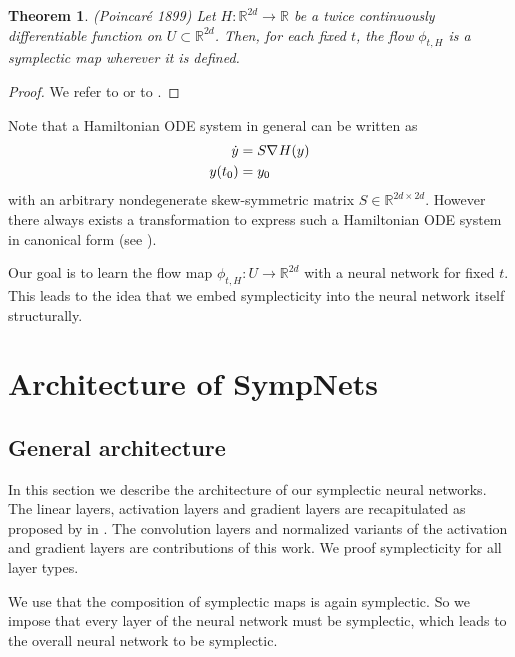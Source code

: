 \documentclass[twoside,a4paper]{article}
\newtheorem{theorem}{Theorem}
\begin{document}
\begin{theorem}(Poincaré 1899)
	Let $H: \mathbb{R}^{2d} \to \mathbb{R}$ be a twice continuously differentiable
	function on $U \subset \mathbb{R}^{2d}$. Then, for each fixed $t$, the flow
	$\phi_{t,H}$ is a symplectic map wherever it is defined.
\end{theorem}
\begin{proof}
	We refer to \citet[Theorem 2.4, p.~184]{hairer2006} 
	or to \citet[Theorem 1, p.~54]{leimkuhler_reich_2005}.
\end{proof}

Note that a Hamiltonian ODE system in general can be written as
\begin{align*}
	\dot{y} &= S \nabla_{}{H}(y) \\
	y(t_0) &= y_0
\end{align*}
with an arbitrary nondegenerate skew-symmetric matrix $S \in \mathbb{R}^{2d \times 2d}$.
However there always exists a transformation to express such a Hamiltonian ODE system in
canonical form (see \citet[Remark 3.8]{peng2016}). 

Our goal is to learn the flow map $\phi_{t,H} : U \to \mathbb{R}^{2d}$ with a neural network
for fixed $t$.
This leads to the idea that we embed symplecticity into the neural network itself structurally.

\section{Architecture of SympNets}

\subsection{General architecture}

In this section we describe the architecture of our symplectic neural networks.
The linear layers, activation layers and gradient layers are recapitulated as 
proposed by \citeauthor{Jin2020} in \cite{Jin2020}.
The convolution layers and normalized variants of the activation and gradient layers
are contributions of this work. 
We proof symplecticity for all layer types. 

We use that the composition of symplectic maps is again symplectic. So we impose that every
layer of the neural network must be symplectic, which leads to the overall neural network
to be symplectic.
\end{document}
